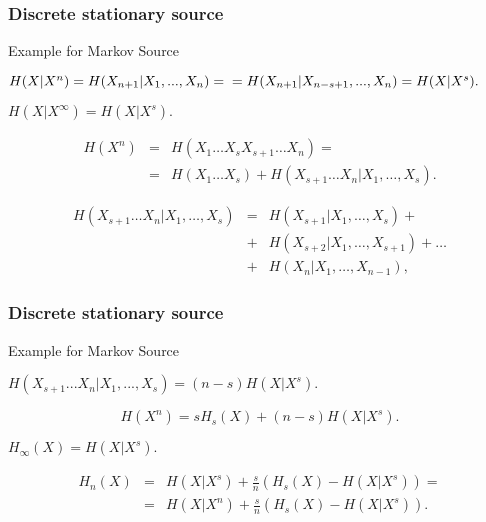 \documentclass[14pt]{beamer}
\begin{document}
\begin{frame}
\frametitle{Discrete stationary source}
Example for Markov Source
\begin{itemize}
\small{

    \item $H(X\vert X^n) = H(X_{n + 1} \vert X_1 ,...,X_n ) = \\
    = H(X_{n + 1} \vert X_{n - s + 1} ,...,X_n ) = H(X\vert X^s).$

    \item $H(X\vert X^\infty ) = H(X\vert X^s).$

    \item
    \begin{eqnarray}
     H(X^n) &=& H(X_1\dots X_s X_{s + 1}\dots X_n )=\nonumber\\
     &=& H(X_1\dots X_s ) + H(X_{s + 1}\dots X_n \vert X_1,\dots,X_s ).
     \label{eq18}
    \end{eqnarray}

    \item 
    \begin{eqnarray*}
    H(X_{s+1}\dots X_n \vert X_1,\dots,X_s ) &=& H(X_{s+1} \vert X_1 ,\dots,X_s ) + \\
    &+& H(X_{s + 2} \vert X_1 , \dots ,X_{s + 1} ) + \dots  \\
    &+& H(X_n \vert X_1,\dots ,X_{n - 1} ),
    \end{eqnarray*}
}
\end{itemize}
\end{frame}


\begin{frame}
\frametitle{Discrete stationary source}
Example for Markov Source
\begin{itemize}
\small{


    \item $H(X_{s + 1} ...X_n \vert X_1 ,...,X_s ) = (n - s)H(X\vert X^s).$

    \item 
    \begin{equation}
    \label{eq19}
    H(X^n) = sH_s (X) + (n - s)H(X\vert X^s).
    \end{equation}
    
    \item $H_\infty (X) = H(X\vert X^s).$
    
    \item
    \begin{eqnarray*}
    H_n (X) &=& H(X\vert X^s) + \frac{s}{n}(H_s (X) - H(X\vert X^s))
    =\\
     &=& H(X\vert X^n) + \frac{s}{n}(H_s (X) - H(X\vert X^s)).
    \end{eqnarray*}

}
\end{itemize}
\end{frame}
\end{document}
